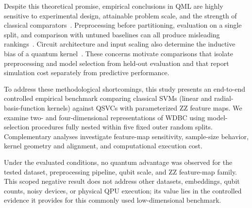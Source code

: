 \documentclass[12pt,a4paper]{article}
\begin{document}
Despite this theoretical promise, empirical conclusions in QML are highly sensitive to experimental design, attainable problem scale, and the strength of classical comparators~\cite{bowles2024better, cerezo2022challenges, leither2026benchmarking}. Preprocessing before partitioning, evaluation on a single split, and comparison with untuned baselines can all produce misleading rankings~\cite{bowles2024better}. Circuit architecture and input scaling also determine the inductive bias of a quantum kernel~\cite{hubregtsen2021evaluation, shaydulin2022importance}. These concerns motivate comparisons that isolate preprocessing and model selection from held-out evaluation and that report simulation cost separately from predictive performance.

To address these methodological shortcomings, this study presents an end-to-end controlled empirical benchmark comparing classical SVMs (linear and radial-basis-function kernels) against QSVCs with parameterized ZZ feature maps. We examine two- and four-dimensional representations of WDBC using model-selection procedures fully nested within five fixed outer random splits. Complementary analyses investigate feature-map sensitivity, sample-size behavior, kernel geometry and alignment, and computational execution cost.

Under the evaluated conditions, no quantum advantage was observed for the tested dataset, preprocessing pipeline, qubit scale, and ZZ feature-map family. This scoped negative result does not address other datasets, embeddings, qubit counts, noisy devices, or physical QPU execution; its value lies in the controlled evidence it provides for this commonly used low-dimensional benchmark.
\end{document}
